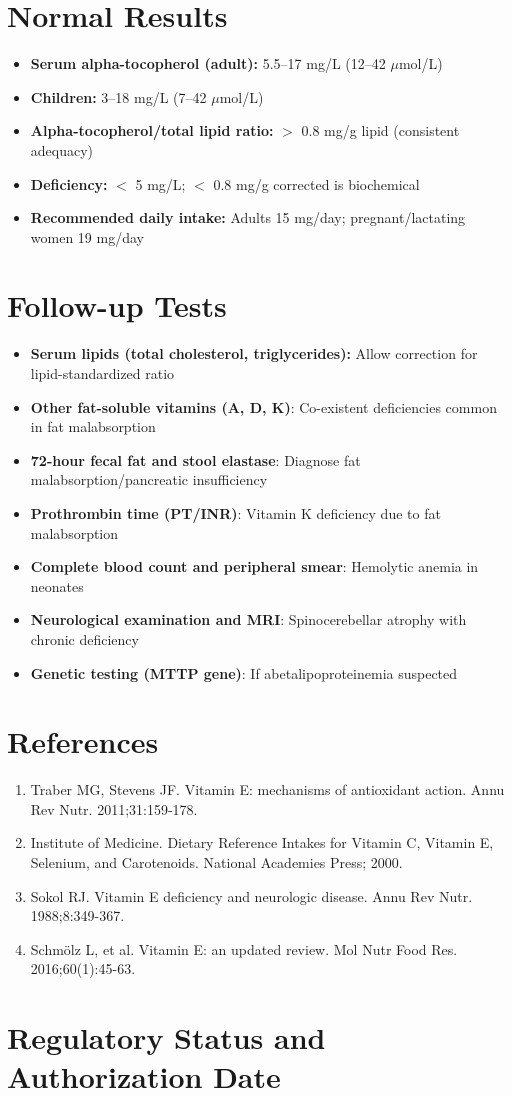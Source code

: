 \section*{Normal Results}
\begin{itemize}
  \item \textbf{Serum alpha-tocopherol (adult):} 5.5--17 mg/L (12--42 $\mu$mol/L)
  \item \textbf{Children:} 3--18 mg/L (7--42 $\mu$mol/L)
  \item \textbf{Alpha-tocopherol/total lipid ratio:} $>$ 0.8 mg/g lipid (consistent adequacy)
  \item \textbf{Deficiency:} $<$ 5 mg/L; $<$ 0.8 mg/g corrected is biochemical
  \item \textbf{Recommended daily intake:} Adults 15 mg/day; pregnant/lactating women 19 mg/day
\end{itemize}

\section*{Follow-up Tests}
\begin{itemize}
  \item \textbf{Serum lipids (total cholesterol, triglycerides):} Allow correction for lipid-standardized ratio
  \item \textbf{Other fat-soluble vitamins (A, D, K)}: Co-existent deficiencies common in fat malabsorption
  \item \textbf{72-hour fecal fat and stool elastase}: Diagnose fat malabsorption/pancreatic insufficiency
  \item \textbf{Prothrombin time (PT/INR)}: Vitamin K deficiency due to fat malabsorption
  \item \textbf{Complete blood count and peripheral smear}: Hemolytic anemia in neonates
  \item \textbf{Neurological examination and MRI}: Spinocerebellar atrophy with chronic deficiency
  \item \textbf{Genetic testing (MTTP gene)}: If abetalipoproteinemia suspected
\end{itemize}

\section*{References}
\begin{enumerate}
  \item Traber MG, Stevens JF. Vitamin E: mechanisms of antioxidant action. Annu Rev Nutr. 2011;31:159-178.
  \item Institute of Medicine. Dietary Reference Intakes for Vitamin C, Vitamin E, Selenium, and Carotenoids. National Academies Press; 2000.
  \item Sokol RJ. Vitamin E deficiency and neurologic disease. Annu Rev Nutr. 1988;8:349-367.
  \item Schmölz L, et al. Vitamin E: an updated review. Mol Nutr Food Res. 2016;60(1):45-63.
\end{enumerate}

\clearpage
\section*{Regulatory Status and Authorization Date}

\clearpage
